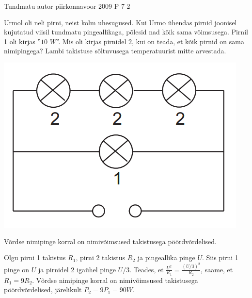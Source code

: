 {Tundmatu autor} %
{piirkonnavoor} %
{2009} %
{P 7} %
{2} %
{

\ifStatement
Urmol oli neli pirni, neist kolm uhesugused. Kui Urmo ühendas pirnid joonisel kujutatud viisil tundmatu pingeallikaga, põlesid nad kõik sama võimsusega. Pirnil 1 oli kirjas ”$10$ $W$”. Mis oli kirjas pirnidel $2$, kui on teada, et kõik pirnid on sama nimipingega? Lambi takistuse sõltuvusega temperatuurist mitte arvestada.
\begin{center}
	\includegraphics[width=0.5\linewidth]{2009-v2p-07-yl.png}
\end{center}
\fi

\ifHint
Võrdse nimipinge korral on nimivõimsused takistusega pöördvõrdelised.
\fi

\ifSolution
Olgu pirni 1 takistus $R_1$, pirni 2 takistus $R_2$ ja pingeallika pinge $U$. Siis pirni 1 pinge on $U$ ja pirnidel 2 igaühel pinge $U/3$. Teades, et 
$\frac{U^2}{R_1} = \frac{(U/3)^2}{R_2}$,
saame, et $R_1 = 9 R_2$. Võrdse nimipinge korral on nimivõimsused takistusega pöördvõrdelised, järelikult $P_2 = 9P_1 = 90 W$.
\fi
}